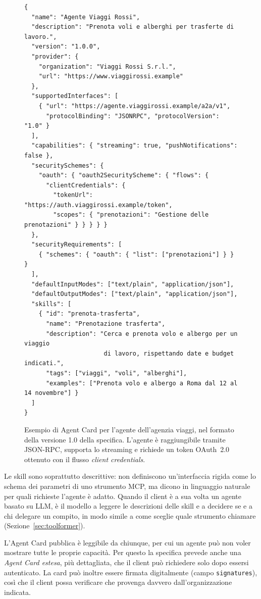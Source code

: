 \begin{figure}[!ht]
\centering
\begin{minipage}{0.95\linewidth}
\footnotesize
\begin{verbatim}
{
  "name": "Agente Viaggi Rossi",
  "description": "Prenota voli e alberghi per trasferte di lavoro.",
  "version": "1.0.0",
  "provider": {
    "organization": "Viaggi Rossi S.r.l.",
    "url": "https://www.viaggirossi.example"
  },
  "supportedInterfaces": [
    { "url": "https://agente.viaggirossi.example/a2a/v1",
      "protocolBinding": "JSONRPC", "protocolVersion": "1.0" }
  ],
  "capabilities": { "streaming": true, "pushNotifications": false },
  "securitySchemes": {
    "oauth": { "oauth2SecurityScheme": { "flows": {
      "clientCredentials": {
        "tokenUrl": "https://auth.viaggirossi.example/token",
        "scopes": { "prenotazioni": "Gestione delle prenotazioni" } } } } }
  },
  "securityRequirements": [
    { "schemes": { "oauth": { "list": ["prenotazioni"] } } }
  ],
  "defaultInputModes": ["text/plain", "application/json"],
  "defaultOutputModes": ["text/plain", "application/json"],
  "skills": [
    { "id": "prenota-trasferta",
      "name": "Prenotazione trasferta",
      "description": "Cerca e prenota volo e albergo per un viaggio
                      di lavoro, rispettando date e budget indicati.",
      "tags": ["viaggi", "voli", "alberghi"],
      "examples": ["Prenota volo e albergo a Roma dal 12 al 14 novembre"] }
  ]
}
\end{verbatim}
\end{minipage}
\caption{Esempio di Agent Card per l'agente dell'agenzia viaggi, nel formato della versione 1.0 della specifica. L'agente è raggiungibile tramite JSON-RPC, 
supporta lo streaming e richiede un token OAuth~2.0 ottenuto con il flusso \emph{client credentials}.}
\label{fig:agent-card}
\end{figure}

Le skill sono soprattutto descrittive: non definiscono un'interfaccia rigida come lo schema dei parametri di uno strumento MCP, ma dicono in linguaggio naturale
per quali richieste l'agente è adatto. Quando il client è a sua volta un agente basato su LLM, è il modello a leggere le descrizioni delle skill e a decidere se 
e a chi delegare un compito, in modo simile a come sceglie quale strumento chiamare (Sezione~\ref{sec:toolformer}).

L'Agent Card pubblica è leggibile da chiunque, per cui un agente può non voler mostrare tutte le proprie capacità. Per questo la specifica prevede anche
 una \emph{Agent Card estesa}, più dettagliata, che il client può richiedere solo dopo essersi autenticato. La card può inoltre essere firmata digitalmente 
 (campo \texttt{signatures}), così che il client possa verificare che provenga davvero dall'organizzazione indicata.

